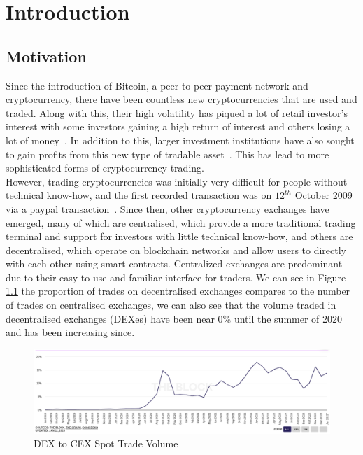 \chapter{Introduction}
\section{Motivation}
Since the introduction of Bitcoin, a peer-to-peer payment network and cryptocurrency, there have been countless new cryptocurrencies that are used and traded. Along with this, their high volatility has piqued a lot of retail investor's interest with some investors gaining a high return of interest and others losing a lot of money~\cite{losing_money_on_crypto_2021}. In addition to this, larger investment institutions have also sought to gain profits from this new type of tradable asset~\cite{gondek_what_nodate}. This has lead to more sophisticated forms of cryptocurrency trading.
\\[5mm]
However, trading cryptocurrencies was initially very difficult for people without technical know-how, and the first recorded transaction was on $12^{th}$ October 2009 via a paypal transaction~\cite{noauthor_history_nodate}. Since then, other cryptocurrency exchanges have emerged, many of which are centralised, which provide a more traditional trading terminal and support for investors with little technical know-how, and others are decentralised, which operate on blockchain networks and allow users to directly with each other using smart contracts. Centralized exchanges are predominant due to their easy-to use and familiar interface for traders. We can see in Figure \ref{fig:dex_to_cex} the proportion of trades on decentralised exchanges compares to the number of trades on centralised exchanges, we can also see that the volume traded in decentralised exchanges (DEXes) have been near 0\% until the summer of 2020 and has been increasing since. 

\begin{figure}[htb!]
    \centering
    \includegraphics[width=\textwidth]{introduction/Images/dex_to_cex.png}
    \caption{{DEX} to {CEX} {Spot} {Trade} {Volume}~\cite{dex_to_cex}}
    \label{fig:dex_to_cex}
\end{figure}
\vspace{-1cm}
